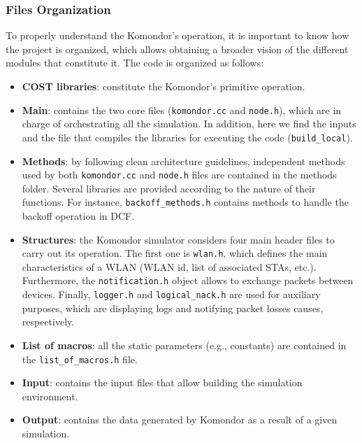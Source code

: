 \documentclass[a4paper]{article}
\begin{document}
		\subsubsection{Files Organization}
		\label{section:files}		
		To properly understand the Komondor's operation, it is important to know how the project is organized, which allows obtaining a broader vision of the different modules that constitute it. The code is organized as follows:
		\begin{itemize}
			\item \textbf{COST libraries}: constitute the Komondor's primitive operation. 
			\item \textbf{Main}: contains the two core files (\texttt{komondor.cc} and \texttt{node.h}), which are in charge of orchestrating all the simulation. In addition, here we find the inputs and the file that compiles the libraries for executing the code (\texttt{build\_local}).
			\item \textbf{Methods}: by following clean architecture guidelines, independent methods used by both \texttt{komondor.cc} and \texttt{node.h} files are contained in the methods folder. Several libraries are provided according to the nature of their functions. For instance, \texttt{backoff\_methods.h} contains methods to handle the backoff operation in DCF.
			\item \textbf{Structures}: the Komondor simulator considers four main header files to carry out its operation. The first one is \texttt{wlan.h}, which defines the main characteristics of a WLAN (WLAN id, list of associated STAs, etc.). Furthermore, the \texttt{notification.h} object allows to exchange packets between devices. Finally, \texttt{logger.h} and \texttt{logical\_nack.h} are used for auxiliary purposes, which are displaying logs and notifying packet losses causes, respectively.
			\item \textbf{List of macros}: all the static parameters (e.g., constants) are contained in the \texttt{list\_of\_macros.h} file. 		
			\item \textbf{Input}: contains the input files that allow building the simulation environment.
			\item \textbf{Output}: contains the data generated by Komondor as a result of a given simulation.	
		\end{itemize}
		
\end{document}
